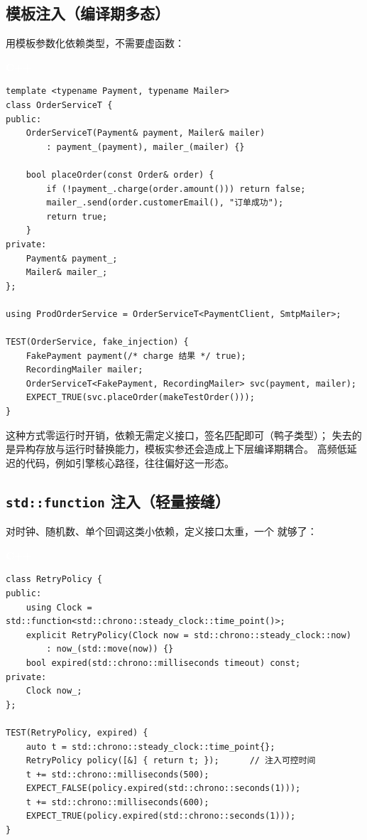 \documentclass[12pt,a4paper,fontset=fandol]{ctexbook}
\newcommand{\cpplabel}{%
  \begin{tcolorbox}[enhanced,colback=cppheadbg,colframe=cppheadbg,
    arc=1mm,boxrule=0mm,left=6pt,right=6pt,top=2pt,bottom=2pt,
    halign=left,oversize]
    \textcolor{white}{\small\bfseries C++}
  \end{tcolorbox}\vspace{-4pt}}
\begin{document}
\subsection{模板注入（编译期多态）}

用模板参数化依赖类型，不需要虚函数：

\cpplabel
\begin{lstlisting}
template <typename Payment, typename Mailer>
class OrderServiceT {
public:
    OrderServiceT(Payment& payment, Mailer& mailer)
        : payment_(payment), mailer_(mailer) {}

    bool placeOrder(const Order& order) {
        if (!payment_.charge(order.amount())) return false;
        mailer_.send(order.customerEmail(), "订单成功");
        return true;
    }
private:
    Payment& payment_;
    Mailer& mailer_;
};

using ProdOrderService = OrderServiceT<PaymentClient, SmtpMailer>;

TEST(OrderService, fake_injection) {
    FakePayment payment(/* charge 结果 */ true);
    RecordingMailer mailer;
    OrderServiceT<FakePayment, RecordingMailer> svc(payment, mailer);
    EXPECT_TRUE(svc.placeOrder(makeTestOrder()));
}
\end{lstlisting}

这种方式零运行时开销，依赖无需定义接口，签名匹配即可（鸭子类型）；
失去的是异构存放与运行时替换能力，模板实参还会造成上下层编译期耦合。
高频低延迟的代码，例如引擎核心路径，往往偏好这一形态。

\subsection{\texttt{std::function} 注入（轻量接缝）}

对时钟、随机数、单个回调这类小依赖，定义接口太重，一个
 就够了：

\cpplabel
\begin{lstlisting}
class RetryPolicy {
public:
    using Clock = std::function<std::chrono::steady_clock::time_point()>;
    explicit RetryPolicy(Clock now = std::chrono::steady_clock::now)
        : now_(std::move(now)) {}
    bool expired(std::chrono::milliseconds timeout) const;
private:
    Clock now_;
};

TEST(RetryPolicy, expired) {
    auto t = std::chrono::steady_clock::time_point{};
    RetryPolicy policy([&] { return t; });      // 注入可控时间
    t += std::chrono::milliseconds(500);
    EXPECT_FALSE(policy.expired(std::chrono::seconds(1)));
    t += std::chrono::milliseconds(600);
    EXPECT_TRUE(policy.expired(std::chrono::seconds(1)));
}
\end{lstlisting}
\end{document}
